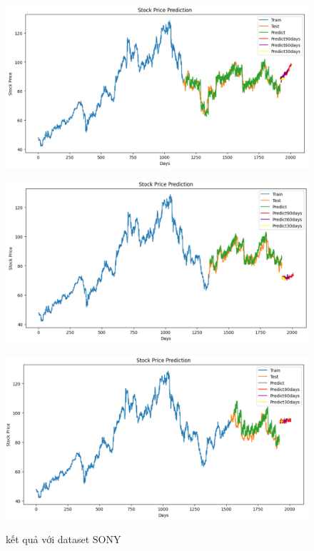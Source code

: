 \documentclass[conference]{IEEEtran}
\begin{document}
\begin{figure}[H]
    \centering
    \begin{minipage}{0.15\textwidth}
    \centering
    \includegraphics[width=1\textwidth]{Image/NBeat/N_BEAT_SONY_6_4.png}
   
    \label{fig:1}
    \end{minipage}%
    \begin{minipage}{0.15\textwidth}
    \centering
    \includegraphics[width=1\textwidth]{Image/NBeat/N_BEAT_SONY_7_3.png}
  
    \label{fig:2}
    \end{minipage}%
    \begin{minipage}{0.15\textwidth}
    \centering
    \includegraphics[width=1\textwidth]{Image/NBeat/N_BEAT_SONY_8_2.png}

    \label{fig:3}
    \end{minipage}
    \caption{kết quả với dataset SONY }
\end{figure}
\end{document}
